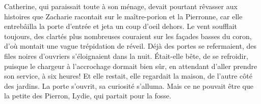 \documentclass[12pt]{orbotech}
\begin{document}
Catherine, qui paraissait toute à son ménage, devait pourtant rêvasser
aux histoires que Zacharie racontait sur le maître-porion et la
Pierronne, car elle entrebâilla la porte d'entrée et jeta un coup
d'oeil dehors.  Le vent soufflait toujours, des clartés plus
nombreuses couraient sur les façades basses du coron, d'où montait une
vague trépidation de réveil.  Déjà des portes se refermaient, des
files noires d'ouvriers s'éloignaient dans la nuit.  Était-elle bête,
de se refroidir, puisque le chargeur à l'accrochage dormait bien sûr,
en attendant d'aller prendre son service, à six heures! Et elle
restait, elle regardait la maison, de l'autre côté des jardins.  La
porte s'ouvrit, sa curiosité s'alluma.  Mais ce ne pouvait être que la
petite des Pierron, Lydie, qui partait pour la fosse.



\end{document}
